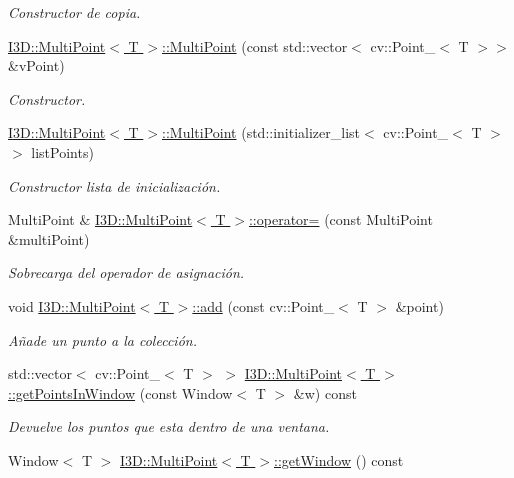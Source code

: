 \begin{DoxyCompactItemize}
\begin{DoxyCompactList}\small\item\em Constructor de copia. \end{DoxyCompactList}\item 
\hyperlink{group___geometric_entities_ga4f8daff9e4ffbfcb5f1cc670f4e3681c}{I3\+D\+::\+Multi\+Point$<$ T $>$\+::\+Multi\+Point} (const std\+::vector$<$ cv\+::\+Point\+\_\+$<$ T $>$$>$ \&v\+Point)
\begin{DoxyCompactList}\small\item\em Constructor. \end{DoxyCompactList}\item 
\hyperlink{group___geometric_entities_ga5e9b29cc4e72496e3c0df560bcaf39d4}{I3\+D\+::\+Multi\+Point$<$ T $>$\+::\+Multi\+Point} (std\+::initializer\+\_\+list$<$ cv\+::\+Point\+\_\+$<$ T $>$$>$ list\+Points)
\begin{DoxyCompactList}\small\item\em Constructor lista de inicialización. \end{DoxyCompactList}\item 
Multi\+Point \& \hyperlink{group___geometric_entities_ga006fc08c663fc30e8f7f5dce0655bf96}{I3\+D\+::\+Multi\+Point$<$ T $>$\+::operator=} (const Multi\+Point \&multi\+Point)
\begin{DoxyCompactList}\small\item\em Sobrecarga del operador de asignación. \end{DoxyCompactList}\item 
void \hyperlink{group___geometric_entities_ga9199a5fd8948e1f456cb0a47f72f99b7}{I3\+D\+::\+Multi\+Point$<$ T $>$\+::add} (const cv\+::\+Point\+\_\+$<$ T $>$ \&point)
\begin{DoxyCompactList}\small\item\em Añade un punto a la colección. \end{DoxyCompactList}\item 
std\+::vector$<$ cv\+::\+Point\+\_\+$<$ T $>$ $>$ \hyperlink{group___geometric_entities_ga2985cb5eede5d9631f87d50aaec4ca5c}{I3\+D\+::\+Multi\+Point$<$ T $>$\+::get\+Points\+In\+Window} (const Window$<$ T $>$ \&w) const 
\begin{DoxyCompactList}\small\item\em Devuelve los puntos que esta dentro de una ventana. \end{DoxyCompactList}\item 
Window$<$ T $>$ \hyperlink{group___geometric_entities_ga25a83a5c3a0477ef6ee6c339cda6c4e7}{I3\+D\+::\+Multi\+Point$<$ T $>$\+::get\+Window} () const 

\end{DoxyCompactItemize}
